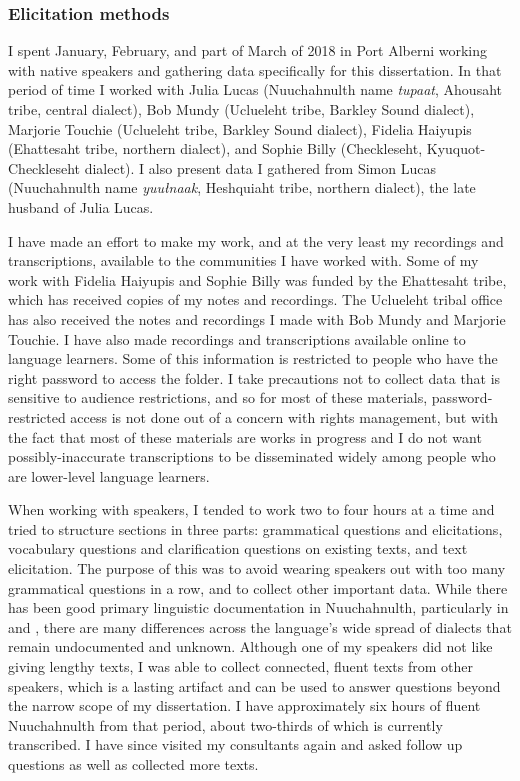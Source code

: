 \subsubsection{Elicitation methods} \label{sec:method:elicitation}

I spent January, February, and part of March of 2018 in Port Alberni working with native speakers and gathering data specifically for this dissertation. In that period of time I worked with Julia Lucas (Nuuchahnulth name \textit{tupaat}, Ahousaht tribe, central dialect), Bob Mundy (Uclueleht tribe, Barkley Sound dialect), Marjorie Touchie (Uclueleht tribe, Barkley Sound dialect), Fidelia Haiyupis (Ehattesaht tribe, northern dialect), and Sophie Billy (Checkleseht, Kyuquot-Checkleseht dialect). I also present data I gathered from Simon Lucas (Nuuchahnulth name \textit{yuułnaak}, Heshquiaht tribe, northern dialect), the late husband of Julia Lucas.

I have made an effort to make my work, and at the very least my recordings and transcriptions, available to the communities I have worked with. Some of my work with Fidelia Haiyupis and Sophie Billy was funded by the Ehattesaht tribe, which has received copies of my notes and recordings. The Uclueleht tribal office has also received the notes and recordings I made with Bob Mundy and Marjorie Touchie. I have also made recordings and transcriptions available online to language learners. Some of this information is restricted to people who have the right password to access the folder. I take precautions not to collect data that is sensitive to audience restrictions, and so for most of these materials, password-restricted access is not done out of a concern with rights management, but with the fact that most of these materials are works in progress and I do not want possibly-inaccurate transcriptions to be disseminated widely among people who are lower-level language learners.

When working with speakers, I tended to work two to four hours at a time and tried to structure sections in three parts: grammatical questions and elicitations, vocabulary questions and clarification questions on existing texts, and text elicitation. The purpose of this was to avoid wearing speakers out with too many grammatical questions in a row, and to collect other important data. While there has been good primary linguistic documentation in Nuuchahnulth, particularly in \cite{sapir1939} and \cite{rose1981}, there are many differences across the language's wide spread of dialects that remain undocumented and unknown. Although one of my speakers did not like giving lengthy texts, I was able to collect connected, fluent texts from other speakers, which is a lasting artifact and can be used to answer questions beyond the narrow scope of my dissertation. I have approximately six hours of fluent Nuuchahnulth from that period, about two-thirds of which is currently transcribed. I have since visited my consultants again and asked follow up questions as well as collected more texts.

